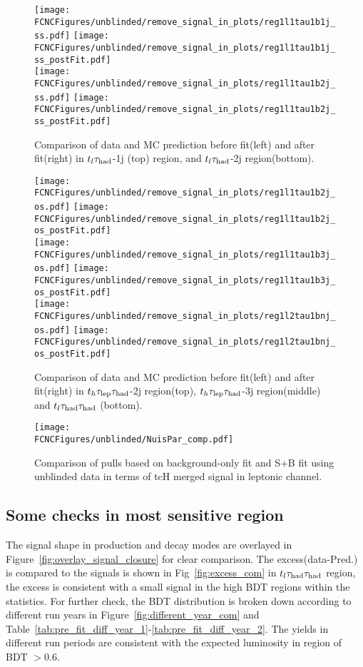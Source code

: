 \begin{figure}[H]
\centering
\texttt{[image: \\FCNCFigures/unblinded/remove\_signal\_in\_plots/reg1l1tau1b1j\_ss.pdf]}
\texttt{[image: \\FCNCFigures/unblinded/remove\_signal\_in\_plots/reg1l1tau1b1j\_ss\_postFit.pdf]}
\\
\texttt{[image: \\FCNCFigures/unblinded/remove\_signal\_in\_plots/reg1l1tau1b2j\_ss.pdf]}
\texttt{[image: \\FCNCFigures/unblinded/remove\_signal\_in\_plots/reg1l1tau1b2j\_ss\_postFit.pdf]}
\caption{Comparison of data and MC prediction before fit(left) and after fit(right) in $t_l\tau_\text{had}$-1j (top) region, and $t_l\tau_\text{had}$-2j region(bottom).}
\label{fig:tthML_remove_signal_1}
\end{figure}

\begin{figure}[H]
\centering
\texttt{[image: \\FCNCFigures/unblinded/remove\_signal\_in\_plots/reg1l1tau1b2j\_os.pdf]}
\texttt{[image: \\FCNCFigures/unblinded/remove\_signal\_in\_plots/reg1l1tau1b2j\_os\_postFit.pdf]}
\\
\texttt{[image: \\FCNCFigures/unblinded/remove\_signal\_in\_plots/reg1l1tau1b3j\_os.pdf]}
\texttt{[image: \\FCNCFigures/unblinded/remove\_signal\_in\_plots/reg1l1tau1b3j\_os\_postFit.pdf]}
\\
\texttt{[image: \\FCNCFigures/unblinded/remove\_signal\_in\_plots/reg1l2tau1bnj\_os.pdf]}
\texttt{[image: \\FCNCFigures/unblinded/remove\_signal\_in\_plots/reg1l2tau1bnj\_os\_postFit.pdf]}
\\
\caption{Comparison of data and MC prediction before fit(left) and after fit(right) in $t_h\tau_\text{lep}{}\tau_\text{had}$-2j region(top), $t_h\tau_\text{lep}{}\tau_\text{had}$-3j region(middle) and $t_l\tau_\text{had}{}\tau_\text{had}$ (bottom).}
\label{fig:tthML_remove_signal_2}
\end{figure}

\begin{figure}[H]
\centering
\texttt{[image: \\FCNCFigures/unblinded/NuisPar\_comp.pdf]}
\caption{Comparison of pulls based on background-only fit and S+B fit using unblinded data in terms of tcH merged signal in leptonic channel.}
\label{fig:tthML_remove_signal_2}
\end{figure}



\subsection{Some checks in most sensitive region}
The signal shape in production and decay modes are overlayed in Figure~\ref{fig:overlay_signal_closure} for clear comparison. The excess(data-Pred.) is compared to the signals is shown in Fig~\ref{fig:excess_com} in $t_l\tau_\text{had}{}\tau_\text{had}$ region, the excess is consistent with a small signal in the high BDT regions within the statistics. For further check, the BDT distribution is broken down according to different run years in Figure~\ref{fig:different_year_com} and Table~\ref{tab:pre_fit_diff_year_1}-\ref{tab:pre_fit_diff_year_2}. The yields in different run periods are consistent with the expected luminosity in region of BDT $>0.6$. 


